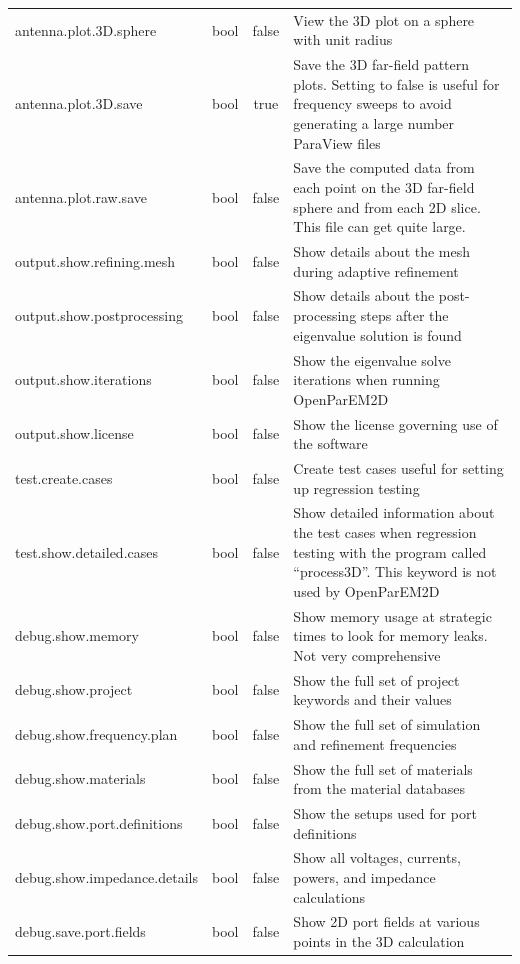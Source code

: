 \documentclass[titlepage]{article}
\renewcommand\_{\textunderscore\linebreak[1]}
\begin{document}
\begin{longtable}[c]{|lccp{8cm}|}
    antenna.plot.3D.sphere        & bool   & false  & View the 3D plot on a sphere with unit radius \\ 
    antenna.plot.3D.save          & bool   & true   & Save the 3D far-field pattern plots.  Setting to false is useful for frequency sweeps to avoid generating a large number ParaView files \\
    antenna.plot.raw.save         & bool   & false  & Save the computed data from each point on the 3D far-field sphere and from each 2D slice.  This file can get quite large. \\
    output.show.refining.mesh     & bool   & false  & Show details about the mesh during adaptive refinement \\
    output.show.postprocessing    & bool   & false  & Show details about the post-processing steps after the eigenvalue solution is found \\
    output.show.iterations        & bool   & false  & Show the eigenvalue solve iterations when running OpenParEM2D \\
    output.show.license           & bool   & false  & Show the license governing use of the software \\
    test.create.cases             & bool   & false  & Create test cases useful for setting up regression testing \\
    test.show.detailed.cases      & bool   & false  & Show detailed information about the test cases when regression testing with the program called “process3D”.  This keyword is not used by OpenParEM2D \\
    debug.show.memory             & bool   & false  & Show memory usage at strategic times to look for memory leaks.  Not very comprehensive \\
    debug.show.project            & bool   & false  & Show the full set of project keywords and their values \\
    debug.show.frequency.plan     & bool   & false  & Show the full set of simulation and refinement frequencies \\
    debug.show.materials          & bool   & false  & Show the full set of materials from the material databases \\
    debug.show.port.definitions   & bool   & false  & Show the setups used for port definitions \\
    debug.show.impedance.details  & bool   & false  & Show all voltages, currents, powers, and impedance calculations \\
    debug.save.port.fields        & bool   & false  & Show 2D port fields at various points in the 3D calculation \\

\end{longtable}
\end{document}
